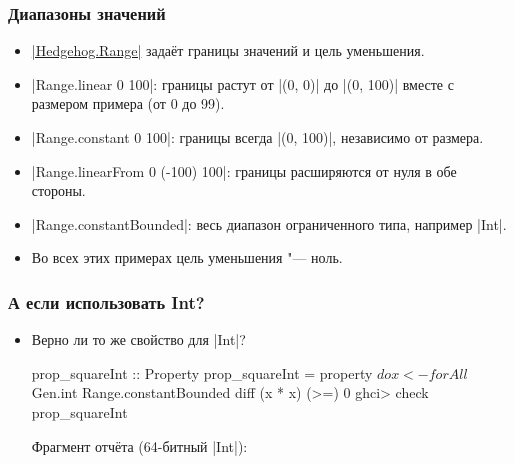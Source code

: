 \documentclass[11pt]{beamer}
\begin{document}
\begin{frame}[fragile]
  \frametitle{Диапазоны значений}
  \begin{itemize}
    \item \href{https://hackage.haskell.org/package/hedgehog/docs/Hedgehog-Range.html}{\haskinline|Hedgehog.Range|} задаёт границы значений и цель уменьшения.
    \item \haskinline|Range.linear 0 100|: границы растут от \haskinline|(0, 0)| до \haskinline|(0, 100)| вместе с размером примера (от 0 до 99).
    \item \haskinline|Range.constant 0 100|: границы всегда \haskinline|(0, 100)|, независимо от размера.
    \item \haskinline|Range.linearFrom 0 (-100) 100|: границы расширяются от нуля в обе стороны.
    \item \haskinline|Range.constantBounded|: весь диапазон ограниченного типа, например \haskinline|Int|.
    \item Во всех этих примерах цель уменьшения "--- ноль.
  \end{itemize}
\end{frame}

\begin{frame}[fragile]
  \frametitle{А если использовать Int?}
  \begin{itemize}
    \item Верно ли то же свойство для \haskinline|Int|?
          \begin{haskellsmall}
            prop_squareInt :: Property
            prop_squareInt = property $ do
              x <- forAll $ Gen.int Range.constantBounded
              diff (x * x) (>=) 0
            ghci> check prop_squareInt
          \end{haskellsmall}
          \pause
          {\footnotesize Фрагмент отчёта (64-битный \haskinline|Int|):}
  \end{itemize}
\end{frame}
\end{document}
